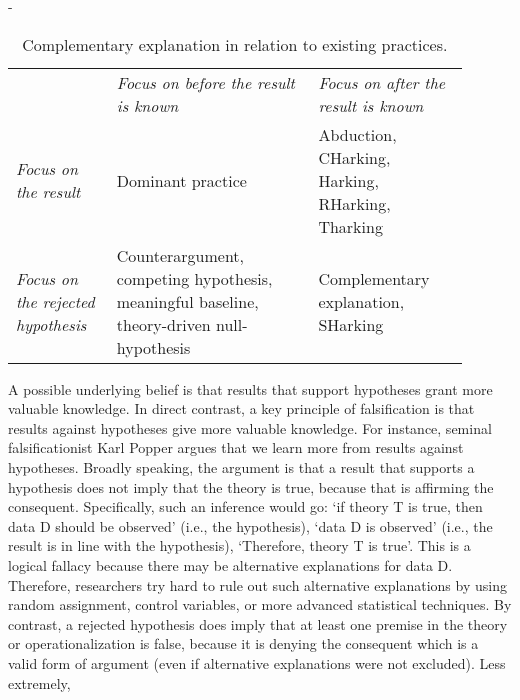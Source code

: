 \documentclass[twocolumn, 10pt]{article}
\newlength{\fullwidthlen}
\newenvironment{fullwidth}{%
  \begin{adjustwidth}{-\fullwidthlen}{}%
}{%
  \end{adjustwidth}%
}
\begin{document}
\begin{table}[H]

  \begin{fullwidth}
    \caption{Complementary explanation in relation to existing practices.
    }
    \label{tab:2}
    \begin{tabularx}{\columnwidth}{@{}>{\RaggedRight\arraybackslash}p{0.2\linewidth} >{\RaggedRight\arraybackslash}p{0.40\linewidth} >{\RaggedRight\arraybackslash}p{0.30\linewidth}@{}}

                                              & \emph{Focus on before the result is known}                                                & \emph{Focus on after the result is known}        \\
      \emph{Focus on the result}              & Dominant practice                                                                         & Abduction, CHarking, Harking, RHarking, Tharking \\
      \emph{Focus on the rejected hypothesis} & Counterargument, competing hypothesis, meaningful baseline, theory-driven null-hypothesis & Complementary explanation, SHarking              \\
    \end{tabularx}
  \end{fullwidth}
\end{table}


\noindent A possible underlying belief is that results that support hypotheses grant more valuable knowledge. In direct contrast, a key principle of falsification is that results against hypotheses give more valuable knowledge. For instance, seminal falsificationist Karl Popper argues that we learn more from results against hypotheses. Broadly speaking, the argument is that a result that supports a hypothesis does not imply that the theory is true, because that is affirming the consequent. Specifically, such an inference would go: ‘if theory T is true, then data D should be observed' (i.e., the hypothesis), ‘data D is observed' (i.e., the result is in line with the hypothesis), ‘Therefore, theory T is true'. This is a logical fallacy because there may be alternative explanations for data D. Therefore, researchers try hard to rule out such alternative explanations by using random assignment, control variables, or more advanced statistical techniques. By contrast, a rejected hypothesis does imply that at least one premise in the theory or operationalization is false, because it is denying the consequent which is a valid form of argument (even if alternative explanations were not excluded). Less extremely, \parencite{Davis1971}
\end{document}
